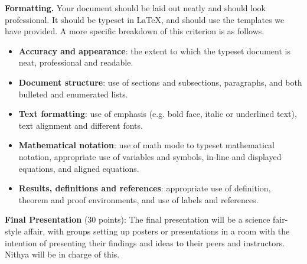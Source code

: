 \documentclass{article}
\begin{document}
\begin{itemize}
\begin{itemize}
        \textbf{Formatting.} Your document should be laid out neatly and should look professional. It should be typeset in \LaTeX, and should use the templates we have provided. A more specific breakdown of this criterion is as follows.
        \begin{itemize}
            \item \textbf{Accuracy and appearance}: the extent to which the typeset document is neat, professional and readable.
            \item \textbf{Document structure}: use of sections and subsections, paragraphs, and both bulleted and enumerated lists.
            \item \textbf{Text formatting}: use of emphasis (e.g. bold face, italic or underlined text), text alignment and different fonts.
            \item \textbf{Mathematical notation}: use of math mode to typeset mathematical notation, appropriate use of variables and symbols, in-line and displayed equations, and aligned equations.
            \item \textbf{Results, definitions and references}: appropriate use of definition, theorem and proof environments, and use of labels and references.
        \end{itemize}
    \end{itemize}
    \textbf{Final Presentation} (30 points): The final presentation will be a science fair-style affair, with groups setting up posters or presentations in a room with the intention of presenting their findings and ideas to their peers and instructors. Nithya will be in charge of this.
\end{itemize}
\end{document}
